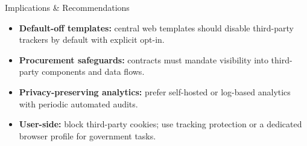   \begin{block}{Implications \& Recommendations}

    \begin{itemize}
      \item \textbf{Default-off templates:} central web templates should disable third-party trackers by default with explicit opt-in.
      \item \textbf{Procurement safeguards:} contracts must mandate visibility into third-party components and data flows.
      \item \textbf{Privacy-preserving analytics:} prefer self-hosted or log-based analytics with periodic automated audits.
      \item \textbf{User-side:} block third-party cookies; use tracking protection or a dedicated browser profile for government tasks.
    \end{itemize}

  \end{block}
